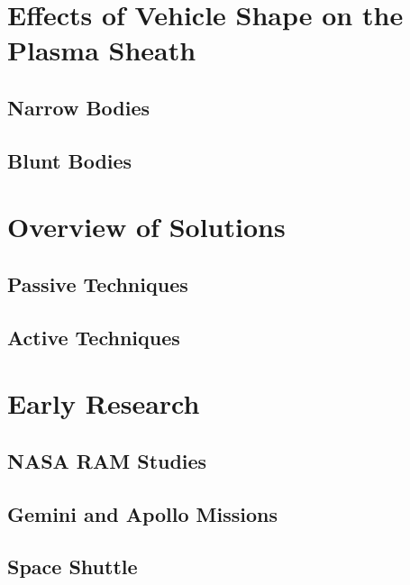 \documentclass[twocolumn]{article}
\begin{document}
\section{Effects of Vehicle Shape on the Plasma Sheath}
\subsection{Narrow Bodies}
\subsection{Blunt Bodies}


\section{Overview of Solutions}
\subsection{Passive Techniques}
\subsection{Active Techniques}

	
\section{Early Research}
\subsection{NASA RAM Studies}
\subsection{Gemini and Apollo Missions}
\subsection{Space Shuttle}
\end{document}

